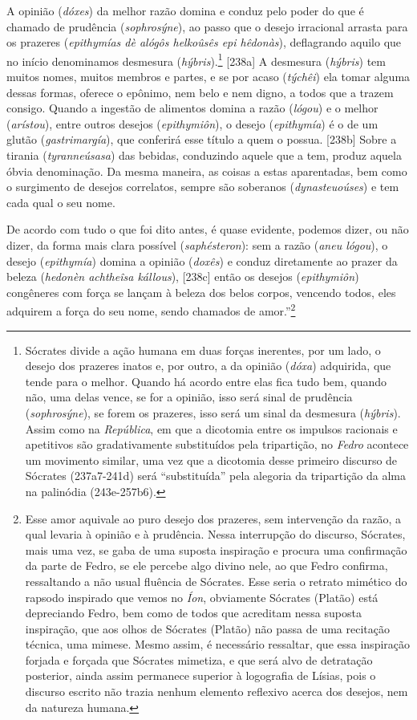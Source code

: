 A opinião (\emph{dóxes}) da melhor razão domina e conduz pelo poder do
que é chamado de prudência (\emph{sophrosýne}), ao passo que o desejo
irracional arrasta para os prazeres (\emph{epithymías dè alógôs
helkoûsês epi hêdonàs}), deflagrando aquilo que no início denominamos
desmesura (\emph{hýbris}).\footnote{Sócrates divide a ação humana em
  duas forças inerentes, por um lado, o desejo dos prazeres inatos e,
  por outro, a da opinião (\emph{dóxa}) adquirida, que tende para o
  melhor. Quando há acordo entre elas fica tudo bem, quando não, uma
  delas vence, se for a opinião, isso será sinal de prudência
  (\emph{sophrosýne}), se forem os prazeres, isso será um sinal da
  desmesura (\emph{hýbris}). Assim como na \emph{República}, em que a
  dicotomia entre os impulsos racionais e apetitivos são gradativamente
  substituídos pela tripartição, no \emph{Fedro} acontece um movimento
  similar, uma vez que a dicotomia desse primeiro discurso de Sócrates
  (237a7-241d) será ``substituída'' pela alegoria da tripartição da alma
  na palinódia (243e-257b6).} {[}238a{]} A desmesura (\emph{hýbris}) tem
muitos nomes, muitos membros e partes, e se por acaso (\emph{týchêi})
ela tomar alguma dessas formas, oferece o epônimo, nem belo e nem digno,
a todos que a trazem consigo. Quando a ingestão de alimentos domina a
razão (\emph{lógou}) e o melhor (\emph{arístou}), entre outros desejos
(\emph{epithymiôn}), o desejo (\emph{epithymía}) é o de um glutão
(\emph{gastrimargía}), que conferirá esse título a quem o possua.
{[}238b{]} Sobre a tirania (\emph{tyranneúsasa}) das bebidas, conduzindo
aquele que a tem, produz aquela óbvia denominação. Da mesma maneira, as
coisas a estas aparentadas, bem como o surgimento de desejos correlatos,
sempre são soberanos (\emph{dynasteuoúses}) e tem cada qual o seu nome.

De acordo com tudo o que foi dito antes, é quase evidente, podemos
dizer, ou não dizer, da forma mais clara possível (\emph{saphésteron}):
sem a razão (\emph{aneu lógou}), o desejo (\emph{epithymía}) domina a
opinião (\emph{doxês}) e conduz diretamente ao prazer da beleza
(\emph{hedonèn achtheîsa kállous}), {[}238c{]} então os desejos
(\emph{epithymiôn}) congêneres com força se lançam à beleza dos belos
corpos, vencendo todos, eles adquirem a força do seu nome, sendo
chamados de amor.''\footnote{Esse amor aquivale ao puro desejo dos
  prazeres, sem intervenção da razão, a qual levaria à opinião e à
  prudência. Nessa interrupção do discurso, Sócrates, mais uma vez, se
  gaba de uma suposta inspiração e procura uma confirmação da parte de
  Fedro, se ele percebe algo divino nele, ao que Fedro confirma,
  ressaltando a não usual fluência de Sócrates. Esse seria o retrato
  mimético do rapsodo inspirado que vemos no \emph{Íon}, obviamente
  Sócrates (Platão) está depreciando Fedro, bem como de todos que
  acreditam nessa suposta inspiração, que aos olhos de Sócrates (Platão)
  não passa de uma recitação técnica, uma mimese. Mesmo assim, é
  necessário ressaltar, que essa inspiração forjada e forçada que
  Sócrates mimetiza, e que será alvo de detratação posterior, ainda
  assim permanece superior à logografia de Lísias, pois o discurso
  escrito não trazia nenhum elemento reflexivo acerca dos desejos, nem
  da natureza humana.}

